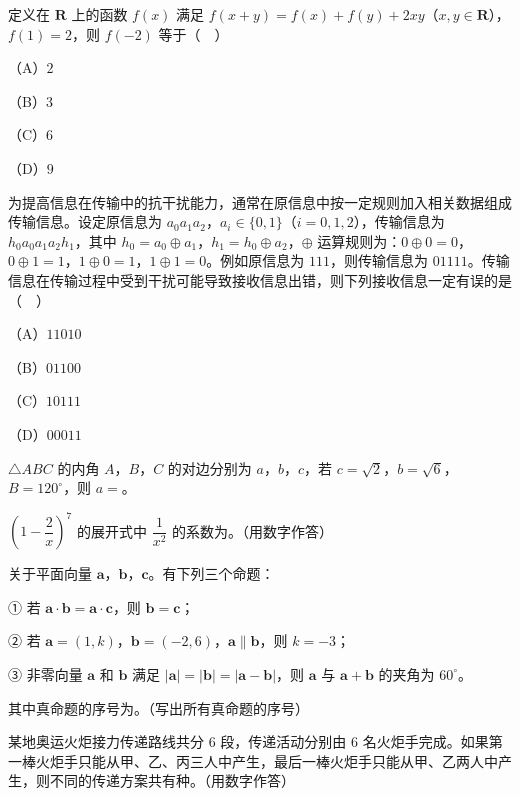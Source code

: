 \begin{question}
定义在 $\mathbf R$ 上的函数 $f(x)$ 满足 $f(x+y)=f(x)+f(y)+2xy$（$x,y\in\mathbf R$），$f(1)=2$，则 $f(-2)$ 等于（　）

（A）$2$

（B）$3$

（C）$6$

（D）$9$

\end{question}
\begin{question}
为提高信息在传输中的抗干扰能力，通常在原信息中按一定规则加入相关数据组成传输信息。设定原信息为 $a_0a_1a_2$，$a_i\in\{0,1\}$（$i=0,1,2$），传输信息为 $h_0a_0a_1a_2h_1$，其中 $h_0=a_0\oplus a_1$，$h_1=h_0\oplus a_2$，$\oplus$ 运算规则为：$0\oplus0=0$，$0\oplus1=1$，$1\oplus0=1$，$1\oplus1=0$。例如原信息为 $111$，则传输信息为 $01111$。传输信息在传输过程中受到干扰可能导致接收信息出错，则下列接收信息一定有误的是（　）

（A）$11010$

（B）$01100$

（C）$10111$

（D）$00011$

\end{question}

\begin{question}
$\triangle ABC$ 的内角 $A$，$B$，$C$ 的对边分别为 $a$，$b$，$c$，若 $c=\sqrt2$，$b=\sqrt6$，$B=120^\circ$，则 $a=$\gkblank{}。

\end{question}
\begin{question}
$\left(1-\dfrac2x\right)^7$ 的展开式中 $\dfrac1{x^2}$ 的系数为\gkblank{}。（用数字作答）

\end{question}
\begin{question}
关于平面向量 $\boldsymbol a$，$\boldsymbol b$，$\boldsymbol c$。有下列三个命题：

① 若 $\boldsymbol a\cdot\boldsymbol b=\boldsymbol a\cdot\boldsymbol c$，则 $\boldsymbol b=\boldsymbol c$；

② 若 $\boldsymbol a=(1,k)$，$\boldsymbol b=(-2,6)$，$\boldsymbol a\parallel\boldsymbol b$，则 $k=-3$；

③ 非零向量 $\boldsymbol a$ 和 $\boldsymbol b$ 满足 $|\boldsymbol a|=|\boldsymbol b|=|\boldsymbol a-\boldsymbol b|$，则 $\boldsymbol a$ 与 $\boldsymbol a+\boldsymbol b$ 的夹角为 $60^\circ$。

其中真命题的序号为\gkblank{}。（写出所有真命题的序号）

\end{question}
\begin{question}
某地奥运火炬接力传递路线共分 $6$ 段，传递活动分别由 $6$ 名火炬手完成。如果第一棒火炬手只能从甲、乙、丙三人中产生，最后一棒火炬手只能从甲、乙两人中产生，则不同的传递方案共有\gkblank{}种。（用数字作答）

\end{question}

